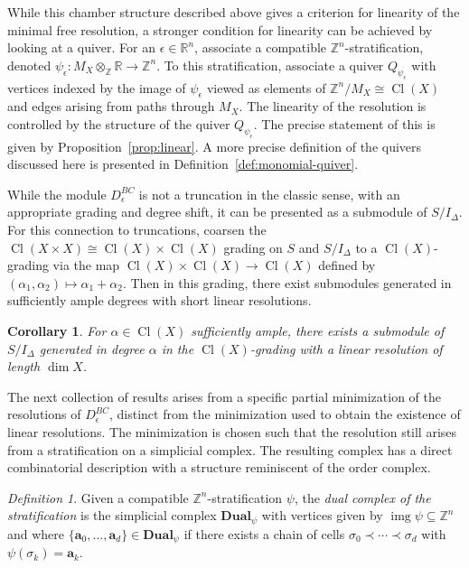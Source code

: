 \documentclass{amsart}
\newcommand{\ZZ}{\mathbb{Z}}
\newcommand{\RR}{\mathbb{R}}
\newcommand{\Dual}{\mathbf{Dual}}
\newcommand{\Mepsilon}{D^{BC}_{\epsilon}}
\DeclareMathOperator{\Cl}{Cl}
\DeclareMathOperator{\img}{img}
\newtheorem{corollary}[theorem]{Corollary}
\theoremstyle{remark}
\newtheorem{definition}[theorem]{Definition}
\begin{document}
While this chamber structure described above gives a criterion for linearity of the minimal free resolution, a stronger condition for linearity can be achieved by looking at a quiver. For an $\epsilon\in \RR^n$, associate a compatible $\ZZ^n$-stratification, denoted $\psi_\epsilon:M_X \otimes_{\ZZ} \RR\rightarrow \ZZ^n$. To this stratification, associate a quiver $Q_{\psi_\epsilon}$ with vertices indexed by the image of $\psi_{\epsilon}$ viewed as elements of $\ZZ^n/M_X\cong \Cl(X)$ and edges arising from paths through $M_X$.
The linearity of the resolution is controlled by the structure of the quiver $Q_{\psi_\epsilon}$. The precise statement of this is given by Proposition~\ref{prop:linear}.
A more precise definition of the quivers discussed here is presented in Definition~\ref{def:monomial-quiver}.

While the module $\Mepsilon$ is not a truncation in the classic sense, with an appropriate grading and degree shift, it can be presented as a submodule of $S/I_{\Delta}$. For this connection to truncations, coarsen the $\Cl(X\times X)\cong \Cl(X)\times \Cl(X)$ grading on $S$ and $S/I_\Delta$ to a $\Cl(X)$-grading via the map $\Cl(X)\times \Cl(X)\to \Cl(X)$ defined by $(\alpha_1,\alpha_2)\mapsto \alpha_1+\alpha_2$. Then in this grading, there exist submodules generated in sufficiently ample degrees with short linear resolutions.

\begin{corollary}
  \label{cor:truncation}
  For $\alpha\in \Cl(X)$ sufficiently ample, there exists a submodule of $S/I_\Delta$ generated in degree $\alpha$ in the $\Cl(X)$-grading with a linear resolution of length $\dim X$.
\end{corollary}

The next collection of results arises from a specific partial minimization of the resolutions of $\Mepsilon$, distinct from the minimization used to obtain the existence of linear resolutions. The minimization is chosen such that the resolution still arises from a stratification on a simplicial complex. The resulting complex has a direct combinatorial description with a structure reminiscent of the order complex.

\begin{definition}
  \label{def:dual-complex}
  Given a compatible $\ZZ^n$-stratification $\psi$, the \emph{dual complex of the stratification} is the simplicial complex $\Dual_\psi$ with vertices given by $\img \psi\subseteq \ZZ^n$ and where $\{\bm{a}_0,\ldots,\bm{a}_d\}\in \Dual_\psi$ if there exists a chain of cells $\sigma_{0}\prec \cdots \prec \sigma_d$ with $\psi(\sigma_k)=\bm{a}_k$. 
\end{definition}
\end{document}
